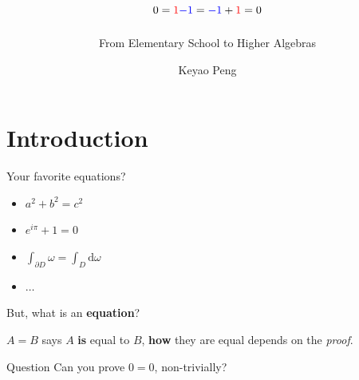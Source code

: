 \documentclass[12pt]{beamer}
\title{\texorpdfstring{$0=\textcolor{red}{1}\textcolor{blue}{ -1 }=\textcolor{blue}{ -1 }+\textcolor{red}{1}=0$}{0=1-1=-1+1=0}}
\subtitle{From Elementary School to Higher Algebras}
\author{Keyao Peng}
\institute{Université de Bourgogne}
\date{}
\begin{document}
\begin{frame}
  \titlepage
\end{frame}


\section{Introduction}

\begin{frame}{Your favorite equations?}
\pause
\begin{itemize}
  \item $a^2+b^2=c^2$
  \item $e^{i\pi}+1=0$
  \item $\int_{ \partial D} \omega =\int_{D} \mathrm{d}\omega$
  \item $ \ldots$ 
\end{itemize}
\pause

But, what is an \textbf{equation}? 

\pause
$A=B$ says $A$ \textbf{is} equal to $B$, \textbf{how} they are equal depends on the \textit{proof}.

\pause

\begin{block}{Question}
  Can you prove $0=0$, non-trivially?
\end{block}

\end{frame}
\end{document}
